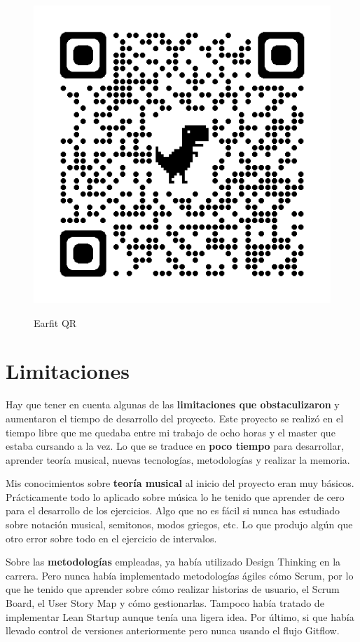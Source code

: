 \documentclass[12pt,twoside,titlepage]{report}
\begin{document}
{\begin{figure}[H]
    \centering
    \includegraphics[scale=0.25]{Conclusiones/EarfitQR}
    \label{fig:EarfitQR}
    \caption{Earfit QR}
\end{figure}

\section{Limitaciones}

Hay que tener en cuenta algunas de las \textbf{limitaciones que obstaculizaron} y aumentaron el tiempo de desarrollo del proyecto. Este proyecto se realizó en el tiempo libre que me quedaba entre mi trabajo de ocho horas y el master que estaba cursando a la vez. Lo que se traduce en \textbf{poco tiempo} para desarrollar, aprender teoría musical, nuevas tecnologías, metodologías y realizar la memoria. 

Mis conocimientos sobre \textbf{teoría musical} al inicio del proyecto eran muy básicos. Prácticamente todo lo aplicado sobre música lo he tenido que aprender de cero para el desarrollo de los ejercicios. Algo que no es fácil si nunca has estudiado sobre notación musical, semitonos, modos griegos, etc. Lo que produjo algún que otro error sobre todo en el ejercicio de intervalos.

Sobre las \textbf{metodologías} empleadas, ya había utilizado Design Thinking en la carrera. Pero nunca había implementado metodologías ágiles cómo Scrum, por lo que he tenido que aprender sobre cómo realizar historias de usuario, el Scrum Board, el User Story Map y cómo gestionarlas. Tampoco había tratado de implementar Lean Startup aunque tenía una ligera idea. Por último, si que había llevado control de versiones anteriormente pero nunca usando el flujo Gitflow.

}
\end{document}
